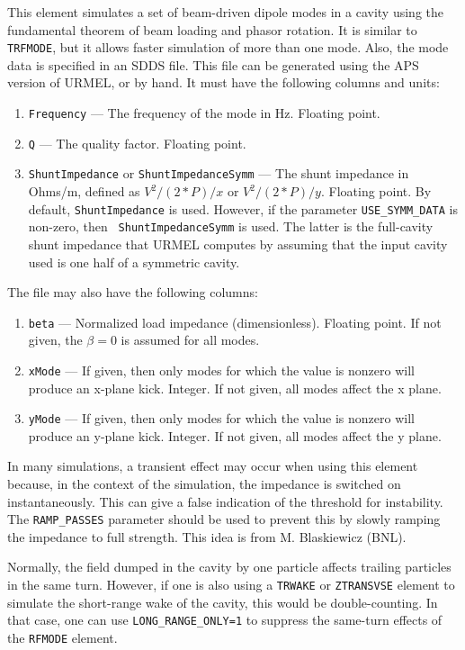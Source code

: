 This element simulates a set of beam-driven dipole modes in a cavity using the fundamental theorem of beam loading and phasor rotation.
It is similar to {\tt TRFMODE}, but it allows faster simulation of more than
one mode.  Also, the mode data is specified in an SDDS file.  This file can be
generated using the APS version of URMEL, or by hand. It must have the following
columns and units:
\begin{enumerate}
\item {\tt Frequency} --- The frequency of the mode in Hz.  Floating point.
\item {\tt Q} --- The quality factor.  Floating point.
\item {\tt ShuntImpedance} or {\tt ShuntImpedanceSymm} --- The shunt
  impedance in Ohms/m, defined as $V^2/(2*P)/x$ or $V^2/(2*P)/y$.
  Floating point. By default, {\tt ShuntImpedance} is used.  However,
  if the parameter \verb|USE_SYMM_DATA| is non-zero, then {\tt
  ShuntImpedanceSymm} is used.  The latter is the full-cavity shunt
  impedance that URMEL computes by assuming that the input cavity used
  is one half of a symmetric cavity.
\end{enumerate}

The file may also have the following columns:
\begin{enumerate}
\item {\tt beta} --- Normalized load impedance (dimensionless).  Floating point. If not given, the
 $\beta=0$ is assumed for all modes. 
\item {\tt xMode} --- If given, then only modes for which the value is nonzero will produce an
 x-plane kick.  Integer.  If not given, all modes affect the x plane.
\item {\tt yMode} --- If given, then only modes for which the value is nonzero will produce an
 y-plane kick.  Integer.  If not given, all modes affect the y plane.
\end{enumerate}
    
In many simulations, a transient effect may occur when using this
element because, in the context of the simulation, the impedance is
switched on instantaneously.  This can give a false indication of the
threshold for instability. The {\tt RAMP\_PASSES} parameter should
be used to prevent this by slowly ramping the impedance to full
strength.  This idea is from M. Blaskiewicz (BNL).

Normally, the field dumped in the cavity by one particle affects trailing particles in the same turn.
However, if one is also using a \verb|TRWAKE| or \verb|ZTRANSVSE| element to simulate the short-range wake of the cavity, this would be double-counting.
In that case, one can use \verb|LONG_RANGE_ONLY=1| to suppress the same-turn effects of the \verb|RFMODE| element.
